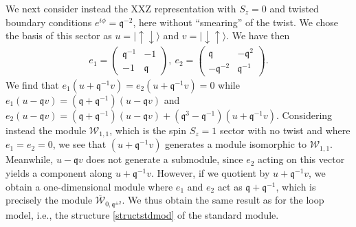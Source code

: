 \documentclass[a4paper,10pt]{article}
\newcommand{\q}{\mathfrak{q}}
\newcommand{\aSt}{\mathcal{W}}
\newcommand{\AStTL}[2]{\aSt_{#1,#2}}
\newcommand{\bAStTL}[2]{\overline{\mathcal{W}}_{#1,#2}}
\begin{document}
We next consider instead the XXZ representation with $S_z=0$ and twisted boundary conditions $e^{i\phi}=\q^{-2}$, here without ``smearing'' of the twist. 
We chose the basis of this sector as $u=|\! \uparrow\downarrow\rangle$ and $v=|\! \downarrow\uparrow\rangle$. We have then 
\begin{eqnarray}\label{stmod}
e_1=\left(\begin{array}{cc}
\q^{-1}&-1\\
-1&\q
\end{array}\right),~
e_2=\left(\begin{array}{cc}
\q &-\q^2\\
-\q^{-2}&\q^{-1}
\end{array}\right) . \end{eqnarray}
%
We find that $e_1(u+\q^{-1}v)=e_2(u+\q^{-1}v)=0$ while $e_1(u-\q v)=(\q+\q^{-1})(u-\q v)$ and $e_2(u-\q v)=(\q+\q^{-1})(u-\q v)+(\q^3-\q^{-1})(u+\q^{-1}v)$. Considering instead the module $\AStTL{1}{1}$, which is the spin $S_z=1$ sector with no twist and where $e_1=e_2=0$, we see that $(u+\q^{-1}v)$ generates a module isomorphic to $\AStTL{1}{1}$. Meanwhile, $u-\q v$ does not generate a submodule, since $e_2$ acting on this vector yields a component along $u+\q^{-1}v$. However, if we quotient by $u+\q^{-1}v$, we obtain a one-dimensional module where $e_1$ and $e_2$ act as $\q+\q^{-1}$, which is precisely the module $\bAStTL{0}{\q^{\pm2}}$. We thus obtain the same result as for the loop model, i.e., the structure \eqref{structstdmod} of the standard module. 
\end{document}

